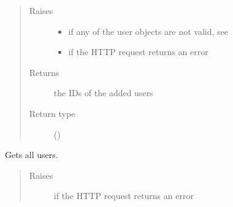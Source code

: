 \documentclass[letterpaper,10pt,english]{sphinxmanual}
\begin{document}
\begin{fulllineitems}
\begin{fulllineitems}
\begin{quote}
\begin{description}
\item[{Raises}] \leavevmode\begin{itemize}
\item {} 
{\hyperref[\detokenize{autoapi/pine/client/exceptions/index:pine.client.exceptions.PineClientValueException}]{}} \textendash{} if any of the user objects are not valid, see {\hyperref[\detokenize{autoapi/pine/client/models/index:pine.client.models.is_valid_eve_user}]{}}

\item {} 
{\hyperref[\detokenize{autoapi/pine/client/exceptions/index:pine.client.exceptions.PineClientHttpException}]{}} \textendash{} if the HTTP request returns an error

\end{itemize}

\item[{Returns}] \leavevmode
the IDs of the added users

\item[{Return type}] \leavevmode
{}()

\end{description}\end{quote}

\end{fulllineitems}


\begin{fulllineitems}
\label{\detokenize{autoapi/pine/client/client/index:pine.client.client.EveClient.get_users}}
Gets all users.
\begin{quote}\begin{description}
\item[{Raises}] \leavevmode
{\hyperref[\detokenize{autoapi/pine/client/exceptions/index:pine.client.exceptions.PineClientHttpException}]{}} \textendash{} if the HTTP request returns an error


\end{description}
\end{quote}
\end{fulllineitems}
\end{fulllineitems}
\end{document}
